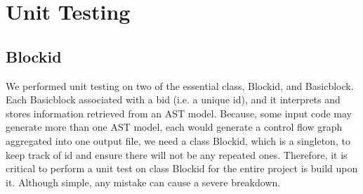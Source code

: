 \documentclass[11pt]{article}
\begin{document}
\section{Unit Testing}\label{Unit Testing}
\subsection{Blockid}
We performed unit testing on two of the essential class, Blockid, and Basicblock. Each Basicblock associated with a bid (i.e. a unique id), and it interprets and stores information retrieved from an AST model. Because, some input code may generate more than one AST model, each would generate a control flow graph aggregated into one output file, we need a class Blockid, which is a singleton, to keep track of id and ensure there will not be any repeated ones. Therefore, it is critical to perform a unit test on class Blockid for the entire project is build upon it. Although simple, any mistake can cause a severe breakdown.
\end{document}
